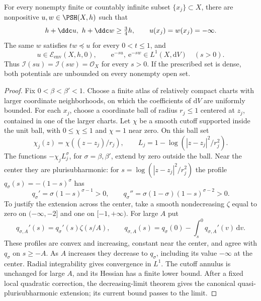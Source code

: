 \begin{theorem}\label{thm:countable-pole-stretching}
For every nonempty finite or countably infinite subset $\{x_j\}\subset X$, there are nonpositive $u,w\in\PSH(X,h)$ such that
\[
 h+\ddc u,\ h+\ddc w\geq\tfrac34h,
 \qquad u(x_j)=w(x_j)=-\infty.
\]
The same $w$ satisfies $tw\preceq u$ for every $0<t\leq1$, and
\[
 u\in\mathcal E_{\mathrm{env}}(X,h,0),\qquad
 \mathrm e^{-su},\ \mathrm e^{-sw}\in L^1(X,\mathrm dV)
 \quad(s>0).
\]
Thus $\mathcal I(su)=\mathcal I(sw)=\mathcal O_X$ for every $s>0$. If the prescribed set is dense, both potentials are unbounded on every nonempty open set.
\end{theorem}
\begin{proof}
Fix $0<\beta<\beta'<1$. Choose a finite atlas of relatively compact charts with larger coordinate neighborhoods, on which the coefficients of $\mathrm dV$ are uniformly bounded. For each $x_j$, choose a coordinate ball of radius $r_j\leq1$ centered at $z_j$, contained in one of the larger charts. Let $\chi$ be a smooth cutoff supported inside the unit ball, with $0\leq\chi\leq1$ and $\chi=1$ near zero. On this ball set
\[
 \chi_j(z)=\chi((z-z_j)/r_j),\qquad
 L_j=1-\log(|z-z_j|^2/r_j^2).
\]
The functions $-\chi_jL_j^\sigma$, for $\sigma=\beta,\beta'$, extend by zero outside the ball. Near the center they are plurisubharmonic: for $s=\log(|z-z_j|^2/r_j^2)$ the profile $q_\sigma(s)=-(1-s)^\sigma$ has
\[
 q_\sigma'=\sigma(1-s)^{\sigma-1}>0,
 \qquad q_\sigma''=\sigma(1-\sigma)(1-s)^{\sigma-2}>0.
\]
To justify the extension across the center, take a smooth nondecreasing $\zeta$ equal to zero on $(-\infty,-2]$ and one on $[-1,+\infty)$. For large $A$ put
\[
 q_{\sigma,A}'(s)=q_\sigma'(s)\zeta(s/A),\qquad
 q_{\sigma,A}(s)=q_\sigma(0)-\int_s^0q_{\sigma,A}'(v)\,\mathrm dv.
\]
These profiles are convex and increasing, constant near the center, and agree with $q_\sigma$ on $s\geq-A$. As $A$ increases they decrease to $q_\sigma$, including its value $-\infty$ at the center. Radial integrability gives convergence in $L^1$. The cutoff annulus is unchanged for large $A$, and its Hessian has a finite lower bound. After a fixed local quadratic correction, the decreasing-limit theorem gives the canonical quasi-plurisubharmonic extension; its current bound passes to the limit.


\end{proof}
